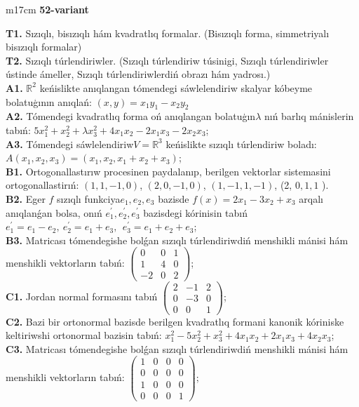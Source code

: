 \documentclass{article}
\begin{document}
\begin{tabular}{m{17cm}}
\textbf{52-variant}
\newline

\textbf{T1.} Sızıqlı, bisızıqlı hám kvadratlıq formalar. (Bisızıqlı forma,  simmetriyalı bisızıqlı formalar)  \\
\textbf{T2.} Sızıqlı túrlendiriwler.  (Sızıqlı túrlendiriw túsinigi, Sızıqlı túrlendiriwler ústinde ámeller, Sızıqlı túrlendiriwlerdiń obrazı hám yadrosı.) \\
\textbf{A1.} \(\mathbb{R}^{2}\) keńislikte anıqlangan tómendegi sáwlelendiriw skalyar kóbeyme bolatuģının anıqlań: \((x,y) = x_{1}y_{1} - x_{2}y_{2}\) \\
\textbf{A2.} Tómendegi kvadratlıq forma oń anıqlangan bolatuģın\(\lambda\) nıń barlıq mánislerin tabıń: \(5x_{1}^{2} + x_{2}^{2} + \lambda x_{3}^{2} + 4x_{1}x_{2} - 2x_{1}x_{3} - 2x_{2}x_{3}\); \\
\textbf{A3.} Tómendegi sáwlelendiriw\(V = \mathbb{R}^{3}\) keńislikte sızıqlı túrlendiriw boladı: \(A\left( x_{1},x_{2},x_{3} \right) = \left( x_{1},x_{2},x_{1} + x_{2} + x_{3} \right)\); \\
\textbf{B1.} Ortogonallastırıw procesinen paydalanıp, berilgen vektorlar sistemasini ortogonallastirıń: \((1,1, - 1,0)\), \((2,0, - 1,0)\), \((1, - 1,1, - 1)\), (2, \(0,1,1\) ). \\
\textbf{B2.} Eger \(f\) sızıqlı funkciya\(e_{1},e_{2},e_{3}\) bazisde \(f(x) = 2x_{1} - 3x_{2} + x_{3}\) arqalı anıqlanǵan bolsa, onıń \(e_{1}^{'},e_{2}^{'},e_{3}^{'}\) bazisdegi kórinisin tabıń\(e_{1}^{'} = e_{1} - e_{2},\ e_{2}^{'} = e_{1} + e_{3},\ \ e_{3}^{'} = e_{1} + e_{2} + e_{3}\); \\
\textbf{B3.} Matricası tómendegishe bolǵan sızıqlı túrlendiriwdiń menshikli mánisi hám menshikli vektorların tabıń: \(\begin{pmatrix} 0 & 0 & 1 \\ 1 & 4 & 0 \\  - 2 & 0 & 2 \end{pmatrix}\); \\
\textbf{C1.} Jordan normal formasını tabıń \(\begin{pmatrix} 2 & - 1 & 2 \\ 0 & - 3 & 0 \\ 0 & 0 & 1 \end{pmatrix}\); \\
\textbf{C2.} Bazi bir ortonormal bazisde berilgen kvadratlıq formani kanonik kóriniske keltiriwshi ortonormal bazisin tabıń: \(x_{1}^{2} - 5x_{2}^{2} + x_{3}^{2} + 4x_{1}x_{2} + 2x_{1}x_{3} + 4x_{2}x_{3}\); \\
\textbf{C3.} Matricası tómendegishe bolǵan sızıqlı túrlendiriwdiń menshikli mánisi hám menshikli vektorların tabıń: \(\begin{pmatrix} 1 & 0 & 0 & 0 \\ 0 & 0 & 0 & 0 \\ 1 & 0 & 0 & 0 \\ 0 & 0 & 0 & 1 \end{pmatrix}\); \\

\end{tabular}
\vspace{1cm}
\end{document}

